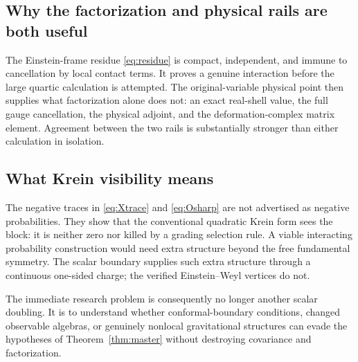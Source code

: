 \documentclass[11pt]{article}
\theoremstyle{definition}
\theoremstyle{remark}
\begin{document}
\subsection{Why the factorization and physical rails are both useful}

The Einstein-frame residue \eqref{eq:residue} is compact, independent,
and immune to cancellation by local contact terms.  It proves a genuine
interaction before the large quartic calculation is attempted.  The
original-variable physical point then supplies what factorization alone
does not: an exact real-shell value, the full gauge cancellation, the
physical adjoint, and the deformation-complex matrix element.  Agreement
between the two rails is substantially stronger than either calculation
in isolation.

\subsection{What Krein visibility means}

The negative traces in \eqref{eq:Xtrace} and \eqref{eq:Osharp} are not
advertised as negative probabilities.  They show that the conventional
quadratic Krein form sees the block: it is neither zero nor killed by a
grading selection rule.  A viable interacting probability construction
would need extra structure beyond the free fundamental symmetry.  The
scalar boundary supplies such extra structure through a continuous
one-sided charge; the verified Einstein--Weyl vertices do not.

The immediate research problem is consequently no longer another scalar
doubling.  It is to understand whether conformal-boundary conditions,
changed observable algebras, or genuinely nonlocal gravitational
structures can evade the hypotheses of Theorem~\ref{thm:master} without
destroying covariance and factorization.
\end{document}
